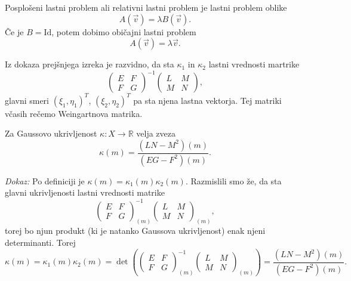 \begin{definicija}
\label{def_posploseni_lastni_problem}
 Posplošeni lastni problem ali relativni lastni problem je lastni problem oblike \begin{equation*}
   A(\vec{v}) = \lambda B(\vec{v}).
 \end{equation*}  
  Če je $B = \text{Id}$, potem dobimo običajni lastni problem \begin{equation*}
    A(\vec{v}) = \lambda \vec{v}.
  \end{equation*}  
\end{definicija}

Iz dokaza prejšnjega izreka je razvidno, da sta $\kappa_1$ in $\kappa_2$ lastni vrednosti martrike \begin{equation*}
  \begin{pmatrix}
  E & F \\
  F & G
  \end{pmatrix}^{-1}\begin{pmatrix}
  L & M \\
  M & N
  \end{pmatrix},
\end{equation*}  
  glavni smeri $(\xi_1, \eta_1)^{T}$, $(\xi_2, \eta_2)^{T}$ pa sta njena lastna vektorja. Tej matriki včasih rečemo
  Weingartnova matrika.


\begin{izrek}
\label{izr_izrazava_gaussove_ukrivljenosti}
Za Gaussovo ukrivljenost $\kappa: X \to  \mathbb{R}$ velja zveza \begin{equation*}
\kappa(m) = \frac{(LN - M^2)(m)}{(EG - F^2)(m)}. 
\end{equation*}  
\end{izrek}

\noindent
{\em Dokaz:\/}
Po definiciji je $\kappa(m) = \kappa_1(m) \kappa_2(m)$. Razmislili smo že, da sta glavni ukrivljenosti
lastni vrednosti matrike \begin{equation*}
  \begin{pmatrix}
    E & F \\
    F & G
    \end{pmatrix}_{(m)}^{-1}\begin{pmatrix}
    L & M \\
    M & N
    \end{pmatrix}_{(m)},
\end{equation*}  
  torej bo njun produkt (ki je natanko Gaussova ukrivljenost) enak njeni determinanti. Torej \begin{equation*}
    \kappa(m) = \kappa_1(m) \kappa_2(m) = \det \left(  \begin{pmatrix}
      E & F \\
      F & G
      \end{pmatrix}_{(m)}^{-1}\begin{pmatrix}
      L & M \\
      M & N
      \end{pmatrix}_{(m)} \right) = \frac{(LN - M^2)(m)}{(EG - F^2)(m)}.
  \end{equation*}  
    
